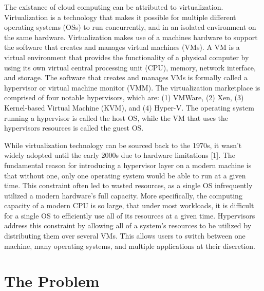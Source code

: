 \documentclass{report}
\begin{document}
\begin{spacing}{1.5}
{\large
The existance of cloud computing can be attributed to virtualization. Virtualization is a technology that makes it possible for multiple different operating systems (OSs) to run concurrently, and in an isolated environment on the same hardware. Virtualization makes use of a machines hardware to support the software that creates and manages virtual machines (VMs). A VM is a virtual environment that provides the functionality of a physical computer by using its own virtual central processing unit (CPU), memory, network interface, and storage. The software that creates and manages VMs is formally called a hypervisor or virtual machine monitor (VMM). The virtualization marketplace is comprised of four notable hypervisors, which are: (1) VMWare, (2) Xen, (3) Kernel-based Virtual Machine (KVM), and (4) Hyper-V. The operating system running a hypervisor is called the host OS, while the VM that uses the hypervisors resources is called the guest OS.
\newline
}

{\large
While virtualization technology can be sourced back to the 1970s, it wasn’t widely adopted until the early 2000s due to hardware limitations [1]. The fundamental reason for introducing a hypervisor layer on a modern machine is that without one, only one operating system would be able to run at a given time. This constraint often led to wasted resources, as a single OS infrequently utilized a modern hardware’s full capacity. More specifically, the computing capacity of a modern CPU is so large, that under most workloads, it is difficult for a single OS to efficiently use all of its resources at a given time. Hypervisors address this constraint by allowing all of a system’s resources to be utilized by distributing them over several VMs. This allows users to switch between one machine, many operating systems, and multiple applications at their discretion.
\newline
}


\section{The Problem}


\end{spacing}
\end{document}
